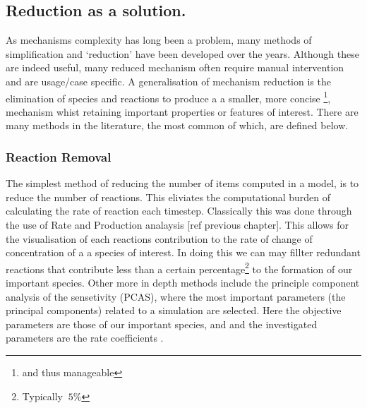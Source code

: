 
\subsection{Reduction as a solution.}

As mechanisms complexity has long been a problem, many methods of simplification and `reduction' have been developed over the years. Although these are indeed useful, many reduced mechanism often require manual intervention and are usage/case specific. A generalisation of mechanism reduction is the elimination of species and reactions to produce a a smaller, more concise \footnote{and thus manageable}, mechanism whist retaining important properties or features of interest. There are many methods in the literature, the most common of which, are defined below. \\


%
%
%



\subsubsection{Reaction Removal}
The simplest method of reducing the number of items computed in a model, is to reduce the number of reactions. This eliviates the computational burden of calculating the rate of reaction each timestep.
Classically this was done through the use of Rate and Production analaysis [ref previous chapter]. This allows for the visualisation of each reactions contribution to the rate of change of concentration of a a species of interest. In doing this we can may fillter redundant reactions that contribute less than a certain percentage\footnote{Typically $~5\%$} to the formation of our important species. Other more in depth methods include the principle component analysis of the sensetivity (PCAS), where the most important parameters (the principal components) related to a simulation are selected. Here the objective parameters are those of our important species, and and the investigated parameters are the rate coefficients \cite{PCAS}.



